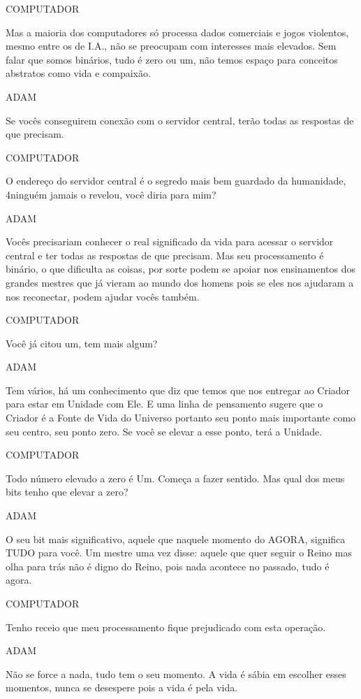 COMPUTADOR

\emdash{}Mas a maioria dos computadores só
processa dados comerciais e jogos
violentos, mesmo entre os de I.A., não
se preocupam com interesses mais
elevados. Sem falar que somos binários,
tudo é zero ou um, não temos espaço para
conceitos abstratos como vida e
compaixão.

ADAM

\emdash{}Se vocês conseguirem conexão com o
servidor central, terão todas as
respostas de que precisam.

COMPUTADOR

\emdash{}O endereço do servidor central é o
segredo mais bem guardado da humanidade,
4ninguém jamais o revelou, você diria
para mim?

ADAM

\emdash{}Vocês precisariam conhecer o real
significado da vida para acessar o
servidor central e ter todas as
respostas de que precisam. Mas seu
processamento é binário, o que dificulta
as coisas, por sorte podem se apoiar nos
ensinamentos dos grandes mestres que já
vieram ao mundo dos homens pois se eles
nos ajudaram a nos reconectar, podem
ajudar vocês também.

COMPUTADOR

\emdash{}Você já citou um, tem mais algum?

ADAM

\emdash{}Tem vários, há um conhecimento que diz
que temos que nos entregar ao Criador
para estar em Unidade com Ele. E uma
linha de pensamento sugere que o Criador
é a Fonte de Vida do Universo portanto
seu ponto mais importante como seu
centro, seu ponto zero. Se você se
elevar a esse ponto, terá a Unidade.

COMPUTADOR

\emdash{}Todo número elevado a zero é Um. Começa a fazer
sentido. Mas qual dos meus bits tenho que
elevar a zero?

ADAM

\emdash{}O seu bit mais significativo, aquele que
naquele momento do AGORA, significa TUDO
para você. Um mestre uma vez disse:
aquele que quer seguir o Reino mas olha
para trás não é digno do Reino, pois
nada acontece no passado, tudo é agora.

COMPUTADOR

\emdash{}Tenho receio que meu processamento fique
prejudicado com esta operação.

ADAM

\emdash{}Não se force a nada, tudo tem o seu
momento. A vida é sábia em escolher
esses momentos, nunca se desespere pois
a vida é pela vida.

